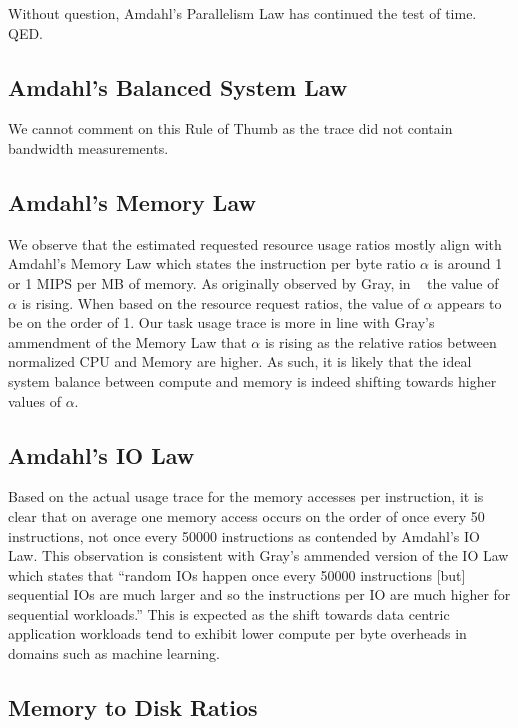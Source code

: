 \documentclass{sig-alternate}
\begin{document}
Without question, Amdahl's Parallelism Law has continued the test of time. QED.

\subsection{Amdahl's Balanced System Law}

We cannot comment on this Rule of Thumb as the trace did not contain bandwidth measurements.

\subsection{Amdahl's Memory Law}

We observe that the estimated requested resource usage ratios mostly align with Amdahl's Memory Law which states the instruction per byte ratio $\alpha$ is around 1 or 1 MIPS per MB of memory.
As originally observed by Gray, in ~\cite{export:68636} the value of $\alpha$ is rising.
When based on the resource request ratios, the value of $\alpha$ appears to be on the order of 1.
Our task usage trace is more in line with Gray's ammendment of the Memory Law that $\alpha$ is rising as the relative ratios between normalized CPU and Memory are higher. 
As such, it is likely that the ideal system balance between compute and memory is indeed shifting towards higher values of $\alpha$.

\subsection{Amdahl's IO Law}

Based on the actual usage trace for the memory accesses per instruction, it is clear that on average one memory access occurs on the order of once every 50 instructions, not once every 50000 instructions as contended by Amdahl's IO Law.
This observation is consistent with Gray's ammended version of the IO Law which states that ``random IOs happen once every 50000 instructions [but] sequential IOs are much larger and so the instructions per IO are much higher for sequential workloads.''
This is expected as the shift towards data centric application workloads tend to exhibit lower compute per byte overheads in domains such as machine learning.

\subsection{Memory to Disk Ratios}
\end{document}
